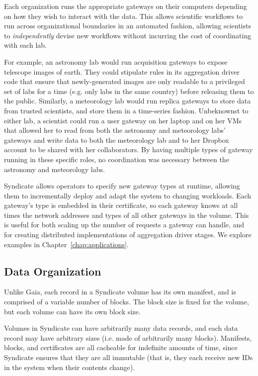 Each organization runs the appropriate gateways on their computers depending on
how they wish to interact with the data.  This allows scientific workflows to
run across organizational boundaries in an automated fashion, allowing
scientists to \emph{independently} devise new workflows without incurring the
cost of coordinating with each lab.

For example, an astronomy lab would
run acquisition gateways to expose telescope images of earth.  They could stipulate rules
in its aggregation driver code that ensure that newly-generated images are only
readable to a privileged set of labs for a time (e.g. only labs in the same
country) before releasing them to the public.  Similarly, a meteorology
lab would run replica gateways to store data from trusted scientists, and
store them in a time-series fashion.  Unbeknownst to either lab, a scientist could
run a user gateway on her laptop and on her VMs that allowed her to read from both the
astronomy and meteorology labs' gateways and write data to both the meteorology
lab and to her Dropbox account to be shared with her collaborators.  By having
multiple types of gateway running in these specific roles, no coordination was
necessary between the astronomy and meteorology labs.

Syndicate allows operators to specify new gateway types at runtime, allowing
them to incrementally deploy and adapt the system to changing workloads.  Each
gateway's type is embedded in their certificate, so each gateway knows at all
times the network addresses and types of all other gateways in the volume.
This is useful for both scaling up the number of requests a gateway can handle,
and for creating distributed implementations of aggregation driver stages.  We
explore examples in Chapter~\ref{chap:applications}.

\subsection{Data Organization}

Unlike Gaia, each record in a Syndicate volume has its own manifest, and is
comprised of a variable number of blocks.  The block size is fixed for the
volume, but each volume can have its own block size.

Volumes in Syndicate can have arbitrarily many data records, and each data
record may have arbitrary sizes (i.e. made of arbitrarily many blocks).
Manifests, blocks, and certificates are all cacheable for
indefinite amounts of time, since Syndicate ensures that they are all immutable
(that is, they each receive new IDs in the system when their contents change).

